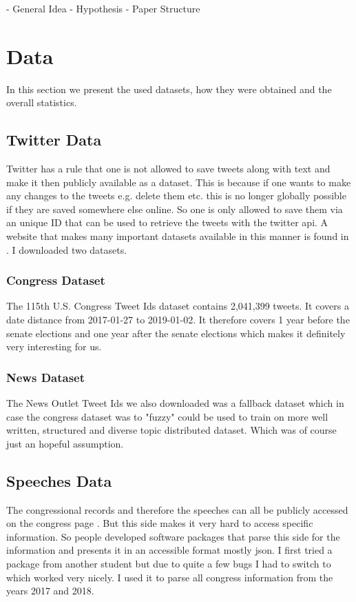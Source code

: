 \documentclass[10pt,conference,compsocconf]{IEEEtran}
\begin{document}
- General Idea
- Hypothesis 
- Paper Structure


\section{Data}
\label{sec:Data}
In this section we present the used datasets, how they were obtained and the overall statistics. 
\subsection{Twitter Data}
Twitter has a rule that one is not allowed to save tweets along with text and make it then publicly available as a dataset. This is because if one wants to make any changes to the tweets e.g. delete them etc. this is no longer globally possible if they are saved somewhere else online. So one is only allowed to save them via an unique ID that can be used to retrieve the tweets with the twitter api. A website that makes many important datasets available in this manner is found in  \cite{twitter_datasets}. I downloaded two datasets.
\subsubsection{Congress Dataset}
The 115th U.S. Congress Tweet Ids dataset contains 2,041,399 tweets. It covers a date distance from 2017-01-27 to 2019-01-02. It therefore covers 1 year before the senate elections and one year after the senate elections which makes it definitely very interesting for us. 
\subsubsection{News Dataset}
The News Outlet Tweet Ids we also downloaded was a fallback dataset which in case the congress dataset was to "fuzzy" could be used to train on more well written, structured and diverse topic distributed dataset. Which was of course just an hopeful assumption. 
\subsection{Speeches Data}
The congressional records and therefore the speeches can all be publicly accessed on the congress page \cite{congress_page}. But this side makes it very hard to access specific information. So people developed software packages that parse this side for the information and presents it in an accessible format mostly json. I first tried a package from another student but due to quite a few bugs I had to switch to \cite{congress-downloader} which worked very nicely. I used it to parse all congress information from the years 2017 and 2018. 
\end{document}
